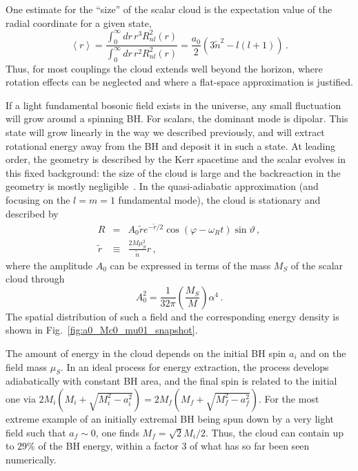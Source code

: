 \documentclass[11pt]{article}
\newcommand{\be}{\begin{equation}}
\newcommand{\ee}{\end{equation}}
\def\beq{\begin{eqnarray}}
\def\eeq{\end{eqnarray}}
\numberwithin{equation}{section} %
\begin{document}
One estimate for the ``size'' of the scalar cloud is the expectation value of the radial coordinate for a given state,
%
\be
\left< r \right> = \frac{\int_0^{\infty}dr\,r^3 R_{nl}^2\left(r\right)}{\int_0^{\infty}dr\,r^2 R_{nl}^2\left(r\right)} = \frac{a_0}{2}\left(3\tilde{n}^2-l(l+1)\right) \, . \label{peak}
\ee
%
Thus, for most couplings the cloud extends well beyond the horizon, where rotation effects can be neglected and where a flat-space approximation is justified.

If a light fundamental bosonic field exists in the universe, any small fluctuation will grow around a spinning BH.
For scalars, the dominant mode is dipolar. This state will grow linearly in the way we described previously, and will extract rotational energy away from the BH and deposit it in such a state. At leading order, the geometry is described by the Kerr spacetime and the scalar evolves in this fixed background: the size of the cloud is large and the backreaction in the geometry is mostly negligible~\cite{Brito:2014wla}. In the quasi-adiabatic approximation (and focusing on the $l=m=1$ fundamental mode), the cloud is stationary and described by
%
\beq
R&=&A_0 \tilde{r}e^{-\tilde{r}/2} \cos\left(\varphi-\omega_Rt\right)\sin\vartheta\,, \label{scalar}\\
%
\tilde{r}&\equiv& \frac{2M\mu_S^2}{\tilde{n}}r \,,
\eeq
%
where the amplitude $A_0$ can be expressed in terms of the mass $M_S$ of the scalar cloud through~\cite{Brito:2014wla}
%
\begin{equation}\label{amplitude}
A_0^2=\frac{1}{32\pi}\left(\frac{M_S}{M}\right) \alpha^4\,. 
\end{equation}
%
The spatial distribution of such a field and the corresponding energy density is shown in Fig.~\ref{fig:a0_Mc0_mu01_snapshot}.


The amount of energy in the cloud depends on the initial BH spin $a_i$ and on the field mass $\mu_S$. In an ideal process for energy extraction, the process develops adiabatically with constant BH area, and the final spin is related to the initial one via
$2M_i(M_i+\sqrt{M_i^2-a_i^2})=2M_f(M_f+\sqrt{M_f^2-a_f^2})$. For the most extreme example of an initially extremal BH being spun down by a very light field such that $a_f\sim 0$, one finds $M_f=\sqrt{2}M_i/2$. Thus, the cloud can contain up to $29\%$ of the BH energy, within a factor 3 of what has so far been seen numerically.
\end{document}
